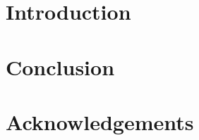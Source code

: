 \documentclass{article}
\begin{document}
\begin{abstract}
\end{abstract}

\section{Introduction} \label{sec:introduction}

\section{Conclusion} \label{sec:conclusion}

\section{Acknowledgements} \label{sec:acknowledgements}


\end{document}
